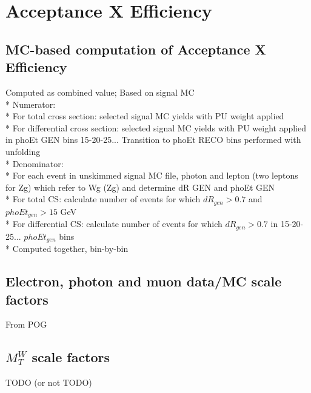 \section{Acceptance X Efficiency}
\label{sec:AccXEff}
\subsection{MC-based computation of Acceptance X Efficiency}
Computed as combined value; Based on signal MC\\*
Numerator:\\*
For total cross section: selected signal MC yields with PU weight applied\\*
For differential cross section: selected signal MC yields with PU weight applied in phoEt GEN bins 15-20-25... Transition to phoEt RECO bins performed with unfolding\\*
Denominator:\\*
For each event in unskimmed signal MC file, photon and lepton (two leptons for Zg) which refer to Wg (Zg) and determine dR GEN and phoEt GEN\\*
For total CS: calculate number of events for which $dR_{gen}>0.7$ and $phoEt_{gen}>15$ GeV\\*
For differential CS: calculate number of events for which $dR_{gen}>0.7$ in 15-20-25... $phoEt_{gen}$ bins\\*
Computed together, bin-by-bin
\subsection{Electron, photon and muon data/MC scale factors}
From POG
\subsection{$M_T^W$ scale factors}
TODO (or not TODO)
